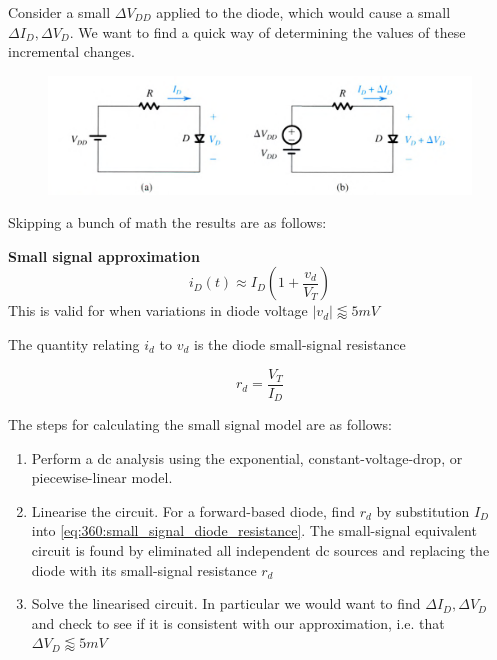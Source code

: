 \documentclass[10pt]{article}
\begin{document}
Consider a small $ \Delta V_{DD} $ applied to the diode, which would cause a small $ \Delta I_D, \Delta V_D $.
We want to find a quick way of determining the values of these incremental changes.

\begin{figure}[H]
	\centering
	\includegraphics[width=0.8\linewidth]{img/image_2022-09-16-23-15-07.png}
\end{figure}

Skipping a bunch of math the results are as follows:


\begin{definition}

	\textbf{Small signal approximation} 
	\begin{equation}
		i_D(t) \approx I_D (1+ \frac{v_d}{V_T} )
	\end{equation}
	This is valid for when variations in diode voltage $ |v_d| \lessapprox 5mV$ 


	The quantity relating $ i_d $ to $ v_d $  is the diode small-signal resistance


	\begin{equation}
	 r_d = \frac{V_T}{I_D} 
	 \label{eq:360:small_signal_diode_resistance}
	\end{equation}
	
\end{definition}



The steps for calculating the small signal model are as follows:

\begin{enumerate}
	\item Perform a dc analysis using the exponential, constant-voltage-drop, or piecewise-linear model.
	\item Linearise the circuit. For a forward-based diode, find $ r_d $ by substitution $ I_D $   into \eqref{eq:360:small_signal_diode_resistance}. The small-signal equivalent circuit is found by eliminated all independent dc sources and replacing the diode with its small-signal resistance $ r_d $ 
	\item Solve the linearised circuit. In particular we would want to find $ \Delta I_D, \Delta V_D $ and check to see if it is consistent with our approximation, i.e. that $ \Delta V_D \lessapprox 5mV $ 
\end{enumerate}
\end{document}
